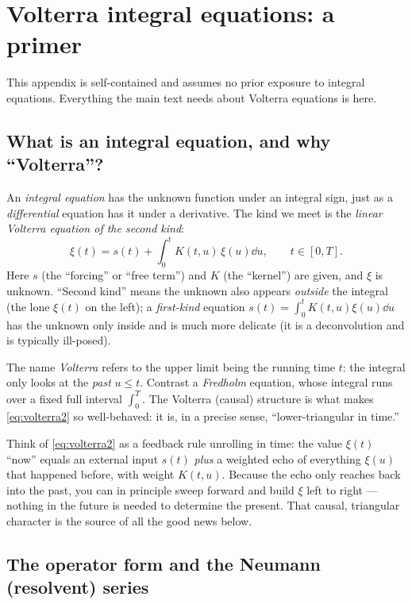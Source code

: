 \section{Volterra integral equations: a primer}
\label{app:volterra}

This appendix is self-contained and assumes no prior exposure to integral
equations. Everything the main text needs about Volterra equations is here.

\subsection{What is an integral equation, and why ``Volterra''?}

An \emph{integral equation} has the unknown function under an integral sign,
just as a \emph{differential} equation has it under a derivative. The kind we meet
is the \emph{linear Volterra equation of the second kind}:
\begin{equation}
\xi(t)=s(t)+\int_0^t K(t,u)\,\xi(u)\dd u,\qquad t\in[0,T].
\label{eq:volterra2}
\end{equation}
Here $s$ (the ``forcing'' or ``free term'') and $K$ (the ``kernel'') are given, and
$\xi$ is unknown. ``Second kind'' means the unknown also appears \emph{outside} the
integral (the lone $\xi(t)$ on the left); a \emph{first-kind} equation
$s(t)=\int_0^t K(t,u)\xi(u)\dd u$ has the unknown only inside and is much more
delicate (it is a deconvolution and is typically ill-posed).

The name \emph{Volterra} refers to the upper limit being the running time $t$:
the integral only looks at the \emph{past} $u\le t$. Contrast a \emph{Fredholm}
equation, whose integral runs over a fixed full interval $\int_0^T$. The Volterra
(causal) structure is what makes \eqref{eq:volterra2} so well-behaved: it is, in a
precise sense, ``lower-triangular in time.''

\begin{intuition}
Think of \eqref{eq:volterra2} as a feedback rule unrolling in time: the value
$\xi(t)$ ``now'' equals an external input $s(t)$ \emph{plus} a weighted echo of
everything $\xi(u)$ that happened before, with weight $K(t,u)$. Because the echo
only reaches back into the past, you can in principle sweep forward and build
$\xi$ left to right --- nothing in the future is needed to determine the present.
That causal, triangular character is the source of all the good news below.
\end{intuition}

\subsection{The operator form and the Neumann (resolvent) series}

